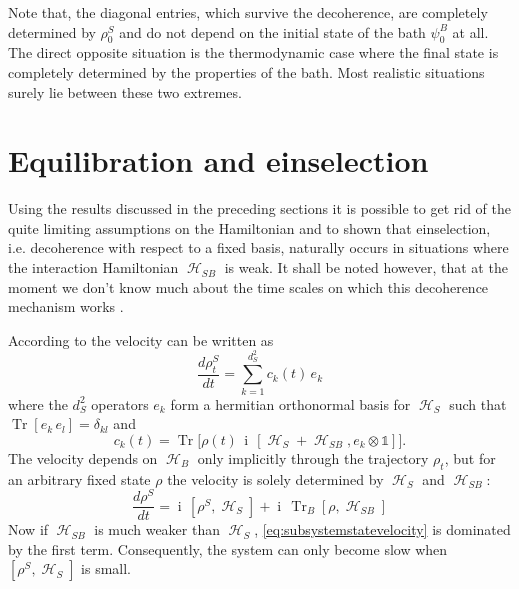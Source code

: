 \documentclass[aps,prl,twocolumn,showpacs,showkeys,a4paper]{revtex4}
\DeclareMathOperator{\Tr}{\mathrm{Tr}}%
\DeclareMathOperator{\iu}{\mathrm{i}}%
\DeclareMathOperator{\hiH}{\mathcal{H}}%
\DeclareMathOperator{\haH}{\mathscr{H}}%
\begin{document}
Note that, the diagonal entries, which survive the decoherence, are completely determined by $\rho^S_0$ and do not depend on the initial state of the bath $\psi^B_0$ at all.
The direct opposite situation is the thermodynamic case where the final state is completely determined by the properties of the bath.
Most realistic situations surely lie between these two extremes.


\section{Equilibration and einselection}
\label{sec:equilibrationandeinselection}
%
Using the results discussed in the preceding sections it is possible to get rid of the quite limiting assumptions on the Hamiltonian and to shown that einselection, i.e. decoherence with respect to a fixed basis, naturally occurs in situations where the interaction Hamiltonian $\haH_{SB}$ is weak.
It shall be noted however, that at the moment we don't know much about the time scales on which this decoherence mechanism works \cite{0907.1267v1}.

According to \cite{0907.1267v1} the velocity can be written as
\begin{equation}
  \frac{d\rho^S_t}{dt} = \sum_{k=1}^{d_S^2} c_k(t)\,e_k
\end{equation}
where the $d_S^2$ operators $e_k$ form a hermitian orthonormal basis for $\hiH_S$ such that $\Tr[e_k\,e_l] = \delta_{kl}$ and
\begin{equation}
  c_k(t) = \Tr\big[\rho(t)\,\iu\,[\haH_S + \haH_{SB},e_k\otimes \mathds{1}]\big] .
\end{equation}
The velocity depends on $\haH_B$ only implicitly through the trajectory $\rho_t$, but for an arbitrary fixed state $\rho$ the velocity is solely determined by $\haH_S$ and $\haH_{SB}$:
\begin{equation}
  \label{eq:subsystemstatevelocity}
  \frac{d\rho^S}{dt} = \iu\,[\rho^S,\haH_S] + \iu\,\Tr_B[\rho,\haH_{SB}]
\end{equation}
Now if $\haH_{SB}$ is much weaker than $\haH_S$, \eqref{eq:subsystemstatevelocity} is dominated by the first term.
Consequently, the system can only become slow when $[\rho^S,\haH_S]$ is small.
\end{document}

